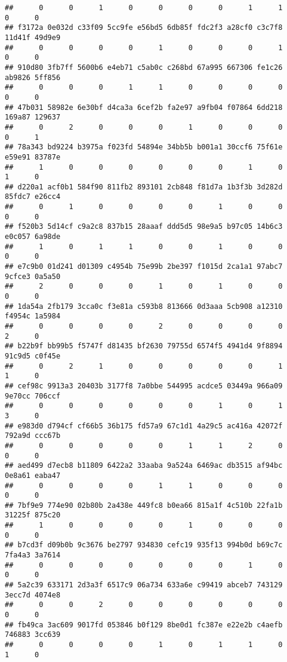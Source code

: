 \documentclass[
]{article}
\begin{document}
\begin{verbatim}
##      0      0      1      0      0      0      0      1      1      0      0 
## f3172a 0e032d c33f09 5cc9fe e56bd5 6db85f fdc2f3 a28cf0 c3c7f8 11d41f 49d9e9 
##      0      0      0      0      1      0      0      0      1      0      0 
## 910d80 3fb7ff 5600b6 e4eb71 c5ab0c c268bd 67a995 667306 fe1c26 ab9826 5ff856 
##      0      0      0      1      1      0      0      0      0      0      0 
## 47b031 58982e 6e30bf d4ca3a 6cef2b fa2e97 a9fb04 f07864 6dd218 169a87 129637 
##      0      2      0      0      0      1      0      0      0      0      1 
## 78a343 bd9224 b3975a f023fd 54894e 34bb5b b001a1 30ccf6 75f61e e59e91 83787e 
##      1      0      0      0      0      0      0      1      0      1      0 
## d220a1 acf0b1 584f90 811fb2 893101 2cb848 f81d7a 1b3f3b 3d282d 85fdc7 e26cc4 
##      0      1      0      0      0      0      1      0      0      0      0 
## f520b3 5d14cf c9a2c8 837b15 28aaaf ddd5d5 98e9a5 b97c05 14b6c3 e0c057 6a98de 
##      1      0      1      1      0      0      1      0      0      0      0 
## e7c9b0 01d241 d01309 c4954b 75e99b 2be397 f1015d 2ca1a1 97abc7 9cfce3 0a5a50 
##      2      0      0      0      1      0      1      0      0      0      0 
## 1da54a 2fb179 3cca0c f3e81a c593b8 813666 0d3aaa 5cb908 a12310 f4954c 1a5984 
##      0      0      0      0      2      0      0      0      0      2      0 
## b22b9f bb99b5 f5747f d81435 bf2630 79755d 6574f5 4941d4 9f8894 91c9d5 c0f45e 
##      0      2      1      0      0      0      0      0      1      1      0 
## cef98c 9913a3 20403b 3177f8 7a0bbe 544995 acdce5 03449a 966a09 9e70cc 706ccf 
##      0      0      0      0      0      0      1      0      1      3      0 
## e983d0 d794cf cf66b5 36b175 fd57a9 67c1d1 4a29c5 ac416a 42072f 792a9d ccc67b 
##      0      0      0      0      0      1      1      2      0      0      0 
## aed499 d7ecb8 b11809 6422a2 33aaba 9a524a 6469ac db3515 af94bc 0e8a61 eaba47 
##      0      0      0      0      1      1      0      0      0      0      0 
## 7bf9e9 774e90 02b80b 2a438e 449fc8 b0ea66 815a1f 4c510b 22fa1b 31225f 875c20 
##      1      0      0      0      0      1      0      0      0      0      0 
## b7cd3f d09b0b 9c3676 be2797 934830 cefc19 935f13 994b0d b69c7c 7fa4a3 3a7614 
##      0      0      0      0      0      0      0      1      0      0      0 
## 5a2c39 633171 2d3a3f 6517c9 06a734 633a6e c99419 abceb7 743129 3ecc7d 4074e8 
##      0      0      2      0      0      0      0      0      0      0      0 
## fb49ca 3ac609 9017fd 053846 b0f129 8be0d1 fc387e e22e2b c4aefb 746883 3cc639 
##      0      0      0      0      1      0      1      1      0      1      0 

\end{verbatim}
\end{document}
